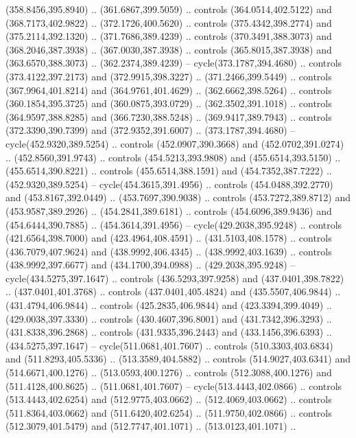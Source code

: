 \begin{scope}[cm={{1.25,0.0,0.0,-1.25,(0.0,743.43331)}}]
    (358.8456,395.8940) .. (361.6867,399.5059) .. controls (364.0514,402.5122) and
    (368.7173,402.9822) .. (372.1726,400.5620) .. controls (375.4342,398.2774) and
    (375.2114,392.1320) .. (371.7686,389.4239) .. controls (370.3491,388.3073) and
    (368.2046,387.3938) .. (367.0030,387.3938) .. controls (365.8015,387.3938) and
    (363.6570,388.3073) .. (362.2374,389.4239) -- cycle(373.1787,394.4680) ..
    controls (373.4122,397.2173) and (372.9915,398.3227) .. (371.2466,399.5449) ..
    controls (367.9964,401.8214) and (364.9761,401.4629) .. (362.6662,398.5264) ..
    controls (360.1854,395.3725) and (360.0875,393.0729) .. (362.3502,391.1018) ..
    controls (364.9597,388.8285) and (366.7230,388.5248) .. (369.9417,389.7943) ..
    controls (372.3390,390.7399) and (372.9352,391.6007) .. (373.1787,394.4680) --
    cycle(452.9320,389.5254) .. controls (452.0907,390.3668) and
    (452.0702,391.0274) .. (452.8560,391.9743) .. controls (454.5213,393.9808) and
    (455.6514,393.5150) .. (455.6514,390.8221) .. controls (455.6514,388.1591) and
    (454.7352,387.7222) .. (452.9320,389.5254) -- cycle(454.3615,391.4956) ..
    controls (454.0488,392.2770) and (453.8167,392.0449) .. (453.7697,390.9038) ..
    controls (453.7272,389.8712) and (453.9587,389.2926) .. (454.2841,389.6181) ..
    controls (454.6096,389.9436) and (454.6444,390.7885) .. (454.3614,391.4956) --
    cycle(429.2038,395.9248) .. controls (421.6564,398.7000) and
    (423.4964,408.4591) .. (431.5103,408.1578) .. controls (436.7079,407.9624) and
    (438.9992,406.4345) .. (438.9992,403.1639) .. controls (438.9992,397.6677) and
    (434.1700,394.0988) .. (429.2038,395.9248) -- cycle(434.5275,397.1647) ..
    controls (436.5293,397.9258) and (437.0401,398.7822) .. (437.0401,401.3768) ..
    controls (437.0401,405.4824) and (435.5507,406.9844) .. (431.4794,406.9844) ..
    controls (425.2835,406.9844) and (423.3394,399.4049) .. (429.0038,397.3330) ..
    controls (430.4607,396.8001) and (431.7342,396.3293) .. (431.8338,396.2868) ..
    controls (431.9335,396.2443) and (433.1456,396.6393) .. (434.5275,397.1647) --
    cycle(511.0681,401.7607) .. controls (510.3303,403.6834) and
    (511.8293,405.5336) .. (513.3589,404.5882) .. controls (514.9027,403.6341) and
    (514.6671,400.1276) .. (513.0593,400.1276) .. controls (512.3088,400.1276) and
    (511.4128,400.8625) .. (511.0681,401.7607) -- cycle(513.4443,402.0866) ..
    controls (513.4443,402.6254) and (512.9775,403.0662) .. (512.4069,403.0662) ..
    controls (511.8364,403.0662) and (511.6420,402.6254) .. (511.9750,402.0866) ..
    controls (512.3079,401.5479) and (512.7747,401.1071) .. (513.0123,401.1071) ..

\end{scope}
